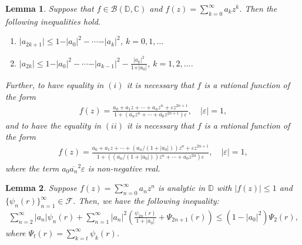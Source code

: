 \documentclass[10pt,a4paper]{amsart}
\newtheorem{lem}{Lemma}
\newcommand{\F}{{\mathcal{F}}}
\newcommand{\beas}{\begin{eqnarray*}}
\newcommand{\eeas}{\end{eqnarray*}}
\renewcommand{\epsilon}{\varepsilon}
\newcommand{\ol}{\overline}
\begin{document}
\begin{lem}\label{lem3}\cite{C1940}\cite[Lemma B]{PVW2020} Suppose that $f\in\mathcal{B}(\mathbb{D},\mathbb{C})$ and $f(z) = \sum_{k=0}^\infty a_kz^k$. Then the following inequalities hold.
\begin{enumerate}
\item[(i)] $\vert a_{2k+1}\vert\leq 1-\vert a_0\vert^2-\cdots-\vert a_k\vert^2$, $k=0,1,\ldots$
\item[(ii)] $\vert a_{2k}\vert\leq 1-\vert a_0\vert^2-\cdots-\vert a_{k-1}\vert^2-\frac{\vert a_k\vert^2}{1+\vert a_0\vert}$, $k=1,2,\ldots$.
\end{enumerate}
Further, to have equality in $(i)$ it is necessary that $f$ is a rational function of the form 
\beas f(z)=\frac{a_0+a_1z+\cdots+a_nz^n+\epsilon z^{2n+1}}{1+(\ol{a_n}z^n+\cdots+\ol{a_0}z^{2n+1})\epsilon},\quad|\epsilon|=1,\eeas
and to have the equality in $(ii)$ it is necessary that $f$ is a rational function of the form 
\beas f(z)=\frac{a_0+a_1z+\cdots+(a_n/(1+|a_0|))z^n+\epsilon z^{2n+1}}{1+((\ol{a_n}/(1+|a_0|))z^n+\cdots+\ol{a_0}z^{2n})\epsilon},\quad|\epsilon|=1,\eeas
where the term $a_0\ol{a_n}^2\epsilon$ is non-negative real.
\end{lem}

\begin{lem}\label{lem7} Suppose $f(z)=\sum_{n=0}^\infty a_nz^n$ is analytic in $\mathbb{D}$ with $|f(z)|\leq1$ and $\{\psi_n(r)\}_{n=1}^\infty \in\F$. Then, we have the following inequality:
\beas \sum_{n=2}^\infty |a_n|\psi_n(r)+\sum_{n=1}^\infty |a_n|^2\left(\frac{\psi_{2n}(r)}{1+|a_0|}+\Psi_{2n+1}(r)\right)\leq \left(1-|a_0|^2\right)\Psi_2(r),\eeas
where $\Psi_t(r)=\sum_{k=t}^\infty \psi_k(r)$.
\end{lem}
\end{document}
